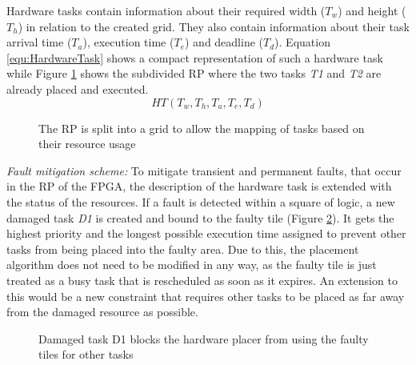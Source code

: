 Hardware tasks contain information about their required width ($T_w$) and height ($T_h$) in relation to the created grid. 
They also contain information about their task arrival time ($T_a$), execution time ($T_e$) and deadline ($T_d$).
Equation \ref{equ:HardwareTask} shows a compact representation of such a hardware task while Figure \ref{fig:TaskGrid} shows the subdivided \gls{RP} where the two tasks \textit{T1} and \textit{T2} are already placed and executed.
\begin{equation}\label{equ:HardwareTask}
    HT(T_w, T_h, T_a, T_e, T_d)
\end{equation}
\begin{figure}
    \centering
    \scalebox{0.5}{
    \resizebox{\smallColumnWidth}{!}{}
    }
    \caption{The \gls{RP} is split into a grid to allow the mapping of tasks based on their resource usage}\label{fig:TaskGrid}
\end{figure}
\emph{Fault mitigation scheme:}
To mitigate transient and permanent faults, that occur in the \gls{RP} of the \gls{FPGA}, the description of the hardware task is extended with the status of the resources.
If a fault is detected within a square of logic, a new damaged task \textit{D1} is created and bound to the faulty tile (Figure \ref{fig:TaskGridFault}).
It gets the highest priority and the longest possible execution time assigned to prevent other tasks from being placed into the faulty area.
Due to this, the placement algorithm does not need to be modified in any way, as the faulty tile is just treated as a busy task that is rescheduled as soon as it expires.
An extension to this would be a new constraint that requires other tasks to be placed as far away from the damaged resource as possible. 
\begin{figure}
    \centering
    \scalebox{0.5}{
    \resizebox{\smallColumnWidth}{!}{}
    }
    \caption{Damaged task D1 blocks the hardware placer from using the faulty tiles for other tasks}\label{fig:TaskGridFault}
\end{figure}
 
